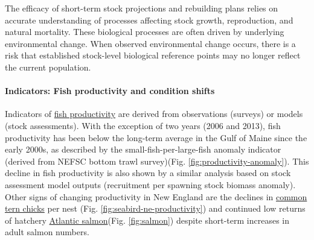 \documentclass[
  10pt,
]{article}
\begin{document}
The efficacy of short-term stock projections and rebuilding plans relies on accurate understanding of processes affecting stock growth, reproduction, and natural mortality. These biological processes are often driven by underlying environmental change. When observed environmental change occurs, there is a risk that established stock-level biological reference points may no longer reflect the current population.

\hypertarget{indicators-fish-productivity-and-condition-shifts}{%
\paragraph{Indicators: Fish productivity and condition shifts}\label{indicators-fish-productivity-and-condition-shifts}}

Indicators of \href{https://noaa-edab.github.io/catalog/productivity_anomaly.html}{fish productivity} are derived from observations (surveys) or models (stock assessments). With the exception of two years (2006 and 2013), fish productivity has been below the long-term average in the Gulf of Maine since the early 2000s, as described by the small-fish-per-large-fish anomaly indicator (derived from NEFSC bottom trawl survey)(Fig. \ref{fig:productivity-anomaly}). This decline in fish productivity is also shown by a similar analysis based on stock assessment model outputs (recruitment per spawning stock biomass anomaly). Other signs of changing productivity in New England are the declines in \href{https://noaa-edab.github.io/catalog/seabird_ne.html}{common tern chicks} per nest (Fig. \ref{fig:seabird-ne-productivity}) and continued low returns of hatchery \href{https://noaa-edab.github.io/catalog/gom_salmon.html}{Atlantic salmon}(Fig. \ref{fig:salmon}) despite short-term increases in adult salmon numbers.
\end{document}
